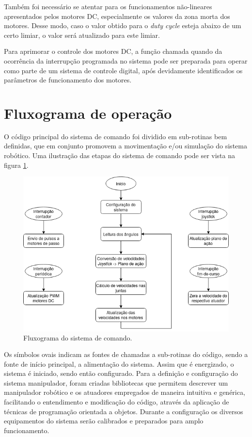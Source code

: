 Também foi necessário se atentar para os funcionamentos não-lineares apresentados pelos motores
DC, especialmente os valores da zona morta dos motores. Desse modo, caso o valor obtido para
o \textit{duty cycle} esteja abaixo de um certo limiar, o valor será atualizado para este limiar.

Para aprimorar o controle dos motores DC, a função chamada quando da ocorrência da 
interrupção programada no sistema pode ser preparada para operar como parte de um sistema
de controle digital, após devidamente identificados os parâmetros de funcionamento dos
motores.

\section{Fluxograma de operação}

O código principal do sistema de comando foi dividido em sub-rotinas bem definidas, que
em conjunto promovem a movimentação e/ou simulação do sistema robótico. Uma ilustração das
etapas do sistema de comando pode ser vista na figura \ref{fig:fluxograma}.

\begin{figure}[h]
    \caption{Fluxograma do sistema de comando.}

    \begin{centering}
        \includegraphics[width=0.8\columnwidth]{images/controle/fluxo.png} 
    \par\end{centering}

    \label{fig:fluxograma}
\end{figure}

Os símbolos ovais indicam as fontes de chamadas a sub-rotinas do código, sendo a fonte 
de início principal, a alimentação do sistema. Assim que é energizado, o sistema é iniciado, sendo
então configurado. Para a definição e configuração do sistema manipulador, foram criadas 
bibliotecas que permitem descrever um manipulador robótico e os atuadores empregados de maneira 
intuitiva e genérica, facilitando o entendimento e modificação do código, através da aplicação de 
técnicas de programação orientada a objetos. Durante a configuração os diversos equipamentos do sistema
serão calibrados e preparados para amplo funcionamento.

